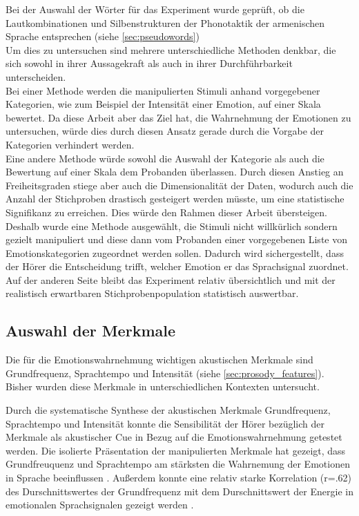 \documentclass[11pt,a4paper,headsepline,twoside,toc=bibliography]{scrreprt}
\begin{document}
Bei der Auswahl der Wörter für das Experiment wurde geprüft, ob die Lautkombinationen und Silbenstrukturen der Phonotaktik der armenischen Sprache entsprechen (siehe \autoref{sec:pseudowords})\\


Um dies zu untersuchen sind mehrere unterschiedliche Methoden denkbar, die sich sowohl in ihrer Aussagekraft als auch in ihrer Durchführbarkeit unterscheiden.\\

Bei einer Methode werden die manipulierten Stimuli anhand vorgegebener Kategorien, wie zum Beispiel der Intensität einer Emotion, auf einer Skala bewertet. Da diese Arbeit aber das Ziel hat, die Wahrnehmung der Emotionen zu untersuchen, würde dies durch diesen Ansatz gerade durch die Vorgabe der Kategorien verhindert werden.\\

Eine andere Methode würde sowohl die Auswahl der Kategorie als auch die Bewertung auf einer Skala dem Probanden überlassen. Durch diesen Anstieg an Freiheitsgraden stiege aber auch die Dimensionalität der Daten, wodurch auch die Anzahl der Stichproben drastisch gesteigert werden müsste, um eine statistische Signifikanz zu erreichen. Dies würde den Rahmen dieser Arbeit übersteigen.\\

Deshalb wurde eine Methode ausgewählt, die Stimuli nicht willkürlich sondern gezielt manipuliert und diese dann vom Probanden einer vorgegebenen Liste von Emotionskategorien zugeordnet werden sollen. Dadurch wird sichergestellt, dass der Hörer die Entscheidung trifft, welcher Emotion er das Sprachsignal zuordnet. Auf der anderen Seite bleibt das Experiment relativ übersichtlich und mit der realistisch erwartbaren Stichprobenpopulation statistisch auswertbar.

\subsection{Auswahl der Merkmale}

Die für die Emotionswahrnehmung wichtigen akustischen Merkmale sind Grundfrequenz, Sprachtempo und Intensität (siehe \ref{sec:prosody_features}). Bisher wurden diese Merkmale in unterschiedlichen Kontexten untersucht. 

 
Durch die systematische Synthese der akustischen Merkmale Grundfrequenz, Sprachtempo und Intensität konnte die Sensibilität der Hörer bezüglich der Merkmale als akustischer Cue in Bezug auf die Emotionswahrnehmung getestet werden. Die isolierte Präsentation der manipulierten Merkmale hat gezeigt, dass Grundfreuquenz und Sprachtempo am stärksten die Wahrnemung der Emotionen in Sprache beeinflussen \autocite{Lieberman1962}.  Außerdem konnte eine relativ starke Korrelation (r=.62) des Durschnittswertes der Grundfrequenz mit dem Durschnittswert der Energie in emotionalen Sprachsignalen gezeigt werden \autocite{Banse1996}.\\
\end{document}
